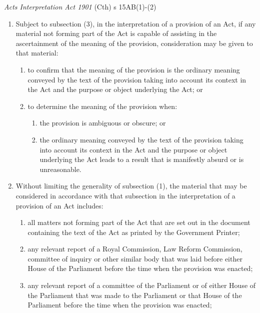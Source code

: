 \begin{statutedetails}{\textit{Acts Interpretation Act 1901} (Cth) s 15AB(1)-(2)}\label{Acts Interpretation Act s 15AB}
    \flushleft
    \begin{enumerate}[label=(\arabic*)]
        \item Subject to subsection (3), in the interpretation of a provision of an Act, if any material not forming part of the Act is capable of assisting in the ascertainment of the meaning of the provision, consideration may be given to that material:
        \begin{enumerate}[label=(\alph*)]
            \item to confirm that the meaning of the provision is the ordinary meaning conveyed by the text of the provision taking into account its context in the Act and the purpose or object underlying the Act; or
            \item to determine the meaning of the provision when:
            \begin{enumerate}[label=(\roman*)]
                \item the provision is ambiguous or obscure; or
                \item the ordinary meaning conveyed by the text of the provision taking into account its context in the Act and the purpose or object underlying the Act leads to a result that is manifestly absurd or is unreasonable.
            \end{enumerate}
        \end{enumerate}
        \item Without limiting the generality of subsection (1), the material that may be considered in accordance with that subsection in the interpretation of a provision of an Act includes:
        \begin{enumerate}[label=(\alph*)]
            \item all matters not forming part of the Act that are set out in the document containing the text of the Act as printed by the Government Printer;
            \item any relevant report of a Royal Commission, Law Reform Commission, committee of inquiry or other similar body that was laid before either House of the Parliament before the time when the provision was enacted;
            \item any relevant report of a committee of the Parliament or of either House of the Parliament that was made to the Parliament or that House of the Parliament before the time when the provision was enacted;

\end{enumerate}
\end{enumerate}
\end{statutedetails}
